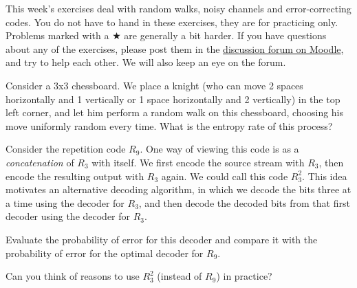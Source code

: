 \documentclass[a4paper,10pt,landscape,twocolumn]{scrartcl}
\begin{document}
\practiceproblems

{\sffamily\noindent
This week's exercises deal with random walks, noisy channels and error-correcting codes. You do not have to hand in these exercises, they are for practicing only. Problems marked with a $\bigstar$ are generally a bit harder. If you have questions about any of the exercises, please post them in the \href{https://www.moodle.ch/lms/mod/forum/view.php?id=1761}{discussion forum on Moodle}, and try to help each other. We will also keep an eye on the forum.
}

\begin{exercise}
Consider a 3x3 chessboard. We place a knight (who can move 2 spaces horizontally and 1 vertically or 1 space horizontally and 2 vertically) in the top left corner, and let him perform a random walk on this chessboard, choosing his move uniformly random every time. What is the entropy rate of this process?
\end{exercise}

\begin{exercise}
Consider the repetition code $R_9$. One way of viewing this code is as a \emph{concatenation} of $R_3$ with itself. We first encode the source stream with $R_3$, then encode the resulting output with $R_3$ again. We could call this code $R_3^2$. This idea motivates an alternative decoding algorithm, in which we decode the bits three at a time using the decoder for $R_3$, and then decode the decoded bits from that first decoder using the decoder for $R_3$.

Evaluate the probability of error for this decoder and compare it with the probability of error for the optimal decoder for $R_9$.

Can you think of reasons to use $R_3^2$ (instead of $R_9$) in practice?
\end{exercise}
\end{document}
